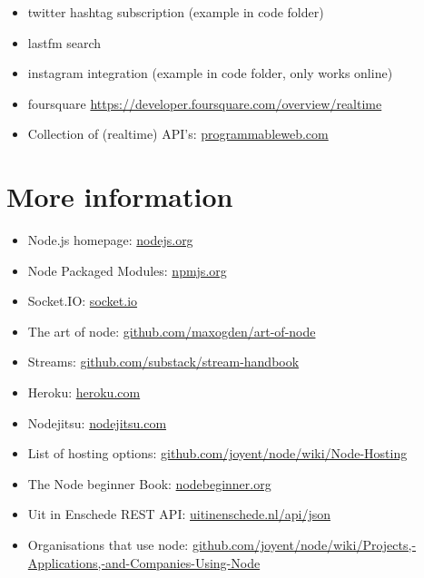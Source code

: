\documentclass[a4paper]{report}
\begin{document}
\begin{itemize}
	\item twitter hashtag subscription (example in code folder)
	\item lastfm search
	\item instagram integration (example in code folder, only works online)
	\item foursquare \href{https://developer.foursquare.com/overview/realtime}{https://developer.foursquare.com/overview/realtime}
	\item Collection of (realtime) API's: \href{http://www.programmableweb.com/}{programmableweb.com}
\end{itemize}

\section*{More information}
\begin{itemize}
	\item Node.js homepage: \href{http://nodejs.org}{nodejs.org}
	\item Node Packaged Modules: \href{https://npmjs.org/}{npmjs.org}
	\item Socket.IO: \href{http://socket.io/}{socket.io}
	\item The art of node: \href{https://github.com/maxogden/art-of-node}{github.com/maxogden/art-of-node}
	\item Streams: \href{https://github.com/substack/stream-handbook}{github.com/substack/stream-handbook}
	\item Heroku: \href{https://www.heroku.com/}{heroku.com}
	\item Nodejitsu: \href{https://www.nodejitsu.com/}{nodejitsu.com}
	\item List of hosting options: \href{https://github.com/joyent/node/wiki/Node-Hosting}{github.com/joyent/node/wiki/Node-Hosting}
	\item The Node beginner Book: \href{http://www.nodebeginner.org/}{nodebeginner.org}
	\item Uit in Enschede REST API: \href{http://www.uitinenschede.nl/api/json/?page=index}{uitinenschede.nl/api/json}
	\item Organisations that use node: \href{https://github.com/joyent/node/wiki/Projects,-Applications,-and-Companies-Using-Node}{github.com/joyent/node/wiki/Projects,-Applications,-and-Companies-Using-Node}
\end{itemize}

\end{document}
